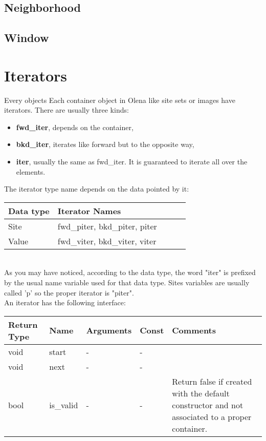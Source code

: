 \documentclass{report}
\begin{document}
\newpage
\section{Neighborhood}



\newpage
\section{Window}



\chapter{Iterators}

Every objects 
Each container object in Olena like site sets or images have iterators.
There are usually three kinds:
\begin{itemize}
\item \textbf{fwd\_iter}, depends on the container,
\item \textbf{bkd\_iter}, iterates like forward but to the opposite way,
\item \textbf{iter}, usually the same as fwd\_iter. It is guaranteed to
iterate all over the elements.
\end{itemize}

The iterator type name depends on the data pointed by it: \\

\begin{tabular}{|l|l|l|l|p{4cm}|}
\hline
Data type & Iterator Names \\ \hline
Site & fwd\_piter, bkd\_piter, piter \\ \hline
Value & fwd\_viter, bkd\_viter, viter \\ \hline
\end{tabular} \\

As you may have noticed, according to the data type, the word "iter" is prefixed
by the usual name variable used for that data type. Sites variables are usually
called 'p' so the proper iterator is "piter".\\


An iterator has the following interface: \\

\begin{tabular}{|l|l|l|l|p{4cm}|}
\hline
Return Type & Name & Arguments & Const & Comments \\ \hline

void & start & - & - & \\ \hline
void & next & - & - & \\ \hline
bool & is\_valid & - & - & Return false if created with the default
constructor and not associated to a proper container.\\ \hline
\end{tabular} \\
\end{document}
